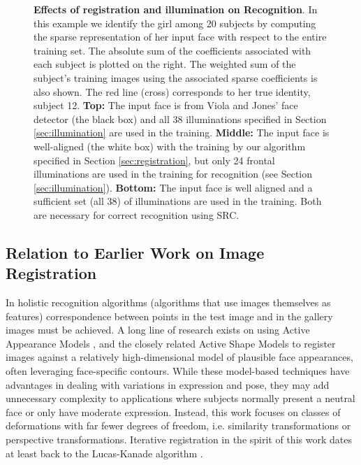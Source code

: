 \begin{figure}
\begin{tabular}{cc}
\end{tabular} \caption{\small{\bf Effects of registration and illumination on
Recognition}. In this example we identify the girl among 20 subjects by
computing the sparse representation of her input face with respect to the
entire training set. The absolute sum of the coefficients associated with each
subject is plotted on the right. The weighted sum of the 
subject's training images using the associated sparse coefficients is also shown.
The red line (cross) corresponds to her true identity, subject 12. {\bf Top:} The
input face is from Viola and Jones' face detector (the black box) and all 38
illuminations specified in Section \ref{sec:illumination} are used in the
training.  {\bf Middle:} The input face is well-aligned (the white box) with
the training by our algorithm specified in Section \ref{sec:registration}, but
only 24 frontal illuminations are used in the training for recognition (see
Section \ref{sec:illumination}). {\bf Bottom:} The input face is well aligned and
a sufficient set (all 38) of
illuminations are used in the training. Both are necessary for correct recognition
using SRC.}\label{fig:promo}
\end{figure}

\subsection{Relation to Earlier Work on Image Registration}

In holistic recognition algorithms (algorithms that use images themselves as
features) correspondence between points in the test image and in the gallery
images must be achieved.  A long line of research exists on using Active
Appearance Models \cite{Cootes2001-PAMI}, and the closely related Active Shape
Models \cite{cootes1992active} to register images against a relatively
high-dimensional model of plausible face appearances, often leveraging
face-specific contours.  While these model-based techniques have advantages in
dealing with variations in expression and pose, they may add unnecessary
complexity to applications where subjects normally present a neutral face or
only have moderate expression. Instead, this work focuses on classes of
deformations with far fewer degrees of freedom, i.e. similarity transformations
or perspective transformations.  Iterative registration in the spirit of this
work dates at least back to the Lucas-Kanade algorithm
\cite{lucas1981iterative}.

